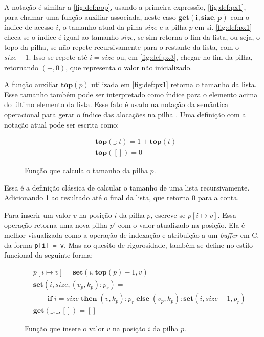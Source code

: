 A notação é similar a \ref{fig:def:pop}, usando a primeira expressão, \ref{fig:def:px1}, para chamar uma função auxiliar associada, neste caso $\mathbf{get(i, size, p)}$ com o índice de acesso $i$, o tamanho atual da pilha $size$ e a pilha $p$ em sí. \ref{fig:def:px1} checa se o índice é igual ao tamanho $size$, se sim retorna o fim da lista, ou seja, o topo da pilha, se não repete recursivamente para o restante da lista, com o $size - 1$. Isso se repete até $i = size$ ou, em \ref{fig:def:px3}, chegar no fim da pilha, retornando $(-,0)$, que representa o valor não inicializado.

A função auxiliar $\mathbf{top}(p)$ utilizada em \ref{fig:def:px1} retorna o tamanho da lista. Esse tamanho também pode ser interpretado como índice para o elemento acima do último elemento da lista. Esse fato é usado na notação da semântica operacional para gerar o índice das alocações na pilha . Uma definição com a notação atual pode ser escrita como:

\begin{figure}[ht]
	\begin{align}
	&\mathbf{top}(\_ : t) = 1 + \mathbf{top}(t) \label{fig:def:top1}\\
	&\mathbf{top}([]) = 0 \label{fig:def:top2}
	\end{align}
	\caption{Função que calcula o tamanho da pilha $p$.}
	\label{fig:def:top}
\end{figure}

Essa é a definição clássica de calcular o tamanho de uma lista recursivamente. Adicionando 1 ao resultado até o final da lista, que retorna 0 para a conta.

Para inserir um valor $v$ na posição $i$ da pilha $p$, escreve-se $p[i \mapsto v]$. Essa operação retorna uma nova pilha $p'$ com o valor atualizado na posição. Ela é melhor visualizada como a operação de indexação e atribuição a um \emph{buffer} em C, da forma \lstinline[language=C]|p[i] = v|. Mas ao quesito de rigorosidade, também se define no estilo funcional da seguinte forma:

\begin{figure}[ht]
	\begin{align}
	&p[i \mapsto v] = \mathbf{set}(i, \mathbf{top}(p) - 1, v) \label{fig:def:set1}\\
	&\mathbf{set}(i, size, (v_p, k_p) : p_r) = \\
	&\quad\quad\mathbf{if}\;i = size \;\mathbf{then}\;(v, k_p) : p_r\;\mathbf{else}\;(v_p, k_p) : \mathbf{set}(i, size - 1, p_r) \label{fig:def:set2}\\
	&\mathbf{get}(\_, \_, []) = [] \label{fig:def:set3}
	\end{align}
	\caption{Função que insere o valor $v$ na posição $i$ da pilha $p$.}
	\label{fig:def:set}
\end{figure}

